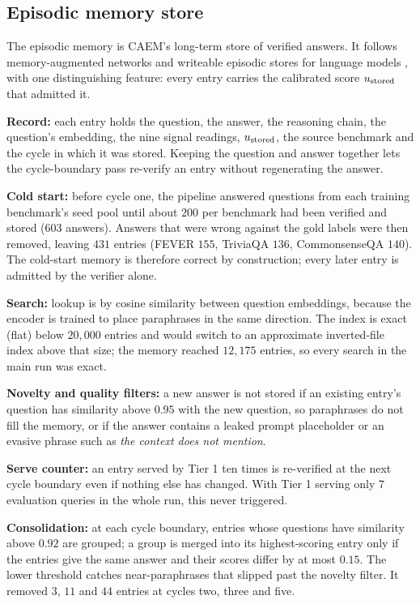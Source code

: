 \subsection{Episodic memory store}
\label{sec:memory-store}

The episodic memory is CAEM's long-term store of verified answers. It follows memory-augmented networks \cite{weston2015memory,graves2014neural,graves2016differentiable} and writeable episodic stores for language models \cite{larimar2024das,xu2025amem}, with one distinguishing feature: every entry carries the calibrated score $u_{\text{stored}}$ that admitted it.

\textbf{Record:} each entry holds the question, the answer, the reasoning chain, the question's embedding, the nine signal readings, $u_{\text{stored}}$, the source benchmark and the cycle in which it was stored. Keeping the question and answer together lets the cycle-boundary pass re-verify an entry without regenerating the answer.

\textbf{Cold start:} before cycle one, the pipeline answered questions from each training benchmark's seed pool until about $200$ per benchmark had been verified and stored ($603$ answers). Answers that were wrong against the gold labels were then removed, leaving $431$ entries (FEVER $155$, TriviaQA $136$, CommonsenseQA $140$). The cold-start memory is therefore correct by construction; every later entry is admitted by the verifier alone.

\textbf{Search:} lookup is by cosine similarity between question embeddings, because the encoder is trained to place paraphrases in the same direction. The index is exact (flat) below $20{,}000$ entries and would switch to an approximate inverted-file index above that size; the memory reached $12{,}175$ entries, so every search in the main run was exact.

\textbf{Novelty and quality filters:} a new answer is not stored if an existing entry's question has similarity above $0.95$ with the new question, so paraphrases do not fill the memory, or if the answer contains a leaked prompt placeholder or an evasive phrase such as \emph{the context does not mention}.

\textbf{Serve counter:} an entry served by Tier 1 ten times is re-verified at the next cycle boundary even if nothing else has changed. With Tier 1 serving only $7$ evaluation queries in the whole run, this never triggered.

\textbf{Consolidation:} at each cycle boundary, entries whose questions have similarity above $0.92$ are grouped; a group is merged into its highest-scoring entry only if the entries give the same answer and their scores differ by at most $0.15$. The lower threshold catches near-paraphrases that slipped past the novelty filter. It removed $3$, $11$ and $44$ entries at cycles two, three and five.

